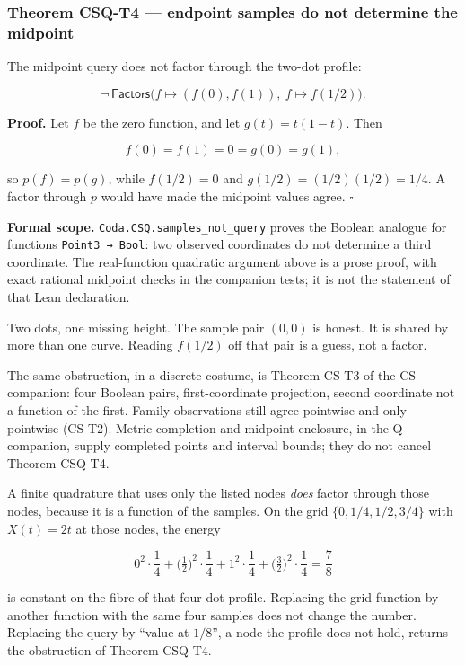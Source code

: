 \documentclass[
  11pt,
]{article}
\begin{document}
\subsubsection{Theorem CSQ-T4 --- endpoint samples do not determine the midpoint}\label{theorem-csq-t4-endpoint-samples-do-not-determine-the-midpoint}

The midpoint query does not factor through the two-dot profile:

\[
\neg\,\mathsf{Factors}\bigl(f\mapsto(f(0),f(1)),\ f\mapsto f(1/2)\bigr).
\]

\textbf{Proof.} Let \(f\) be the zero function, and let \(g(t)=t(1-t)\). Then

\[
f(0)=f(1)=0=g(0)=g(1),
\]

so \(p(f)=p(g)\), while \(f(1/2)=0\) and \(g(1/2)=(1/2)(1/2)=1/4\). A factor through \(p\) would have made the midpoint values agree. \(\square\)

\textbf{Formal scope.} \nolinkurl{Coda.CSQ.samples_not_query} proves the Boolean analogue for functions \texttt{Point3\ →\ Bool}: two observed coordinates do not determine a third coordinate. The real-function quadratic argument above is a prose proof, with exact rational midpoint checks in the companion tests; it is not the statement of that Lean declaration.

Two dots, one missing height. The sample pair \((0,0)\) is honest. It is shared by more than one curve. Reading \(f(1/2)\) off that pair is a guess, not a factor.

The same obstruction, in a discrete costume, is Theorem CS-T3 of the CS companion: four Boolean pairs, first-coordinate projection, second coordinate not a function of the first. Family observations still agree pointwise and only pointwise (CS-T2). Metric completion and midpoint enclosure, in the Q companion, supply completed points and interval bounds; they do not cancel Theorem CSQ-T4.

A finite quadrature that uses only the listed nodes \emph{does} factor through those nodes, because it is a function of the samples. On the grid \(\{0,1/4,1/2,3/4\}\) with \(X(t)=2t\) at those nodes, the energy

\[
0^2\cdot\frac14
+
\bigl(\tfrac12\bigr)^2\cdot\frac14
+
1^2\cdot\frac14
+
\bigl(\tfrac32\bigr)^2\cdot\frac14
=
\frac78
\]

is constant on the fibre of that four-dot profile. Replacing the grid function by another function with the same four samples does not change the number. Replacing the query by ``value at \(1/8\)'', a node the profile does not hold, returns the obstruction of Theorem CSQ-T4.
\end{document}
